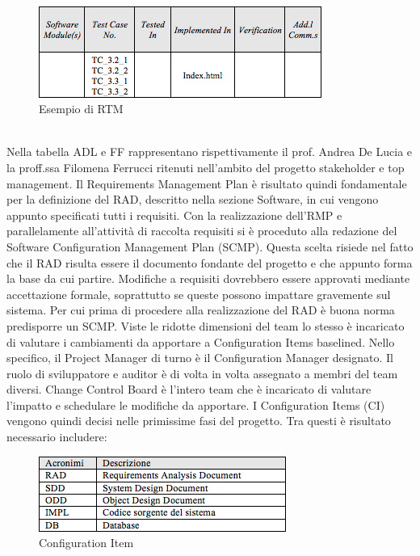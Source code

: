 \\
\begin{figure}[h]
\centering
\includegraphics[scale=.7]{img/4.png}
\caption{Esempio di RTM}
\label{fig:cd}
\end{figure}
\\
Nella tabella ADL e FF rappresentano rispettivamente il prof. Andrea De Lucia e la proff.ssa Filomena Ferrucci ritenuti nell\rq ambito del progetto stakeholder e top management.
Il Requirements Management Plan \`{e} risultato quindi fondamentale per la definizione del RAD, descritto nella sezione Software, in cui vengono appunto specificati tutti i requisiti.
Con la realizzazione dell\rq RMP e parallelamente all’attivit\`{a} di raccolta requisiti si \`{e} proceduto alla redazione del Software Configuration Management Plan (SCMP). Questa scelta risiede nel fatto che il RAD risulta essere il documento fondante del progetto e che appunto forma la base da cui partire. Modifiche a requisiti dovrebbero essere approvati mediante accettazione formale, soprattutto se queste possono impattare gravemente sul sistema.
Per cui prima di procedere alla realizzazione del RAD \`{e} buona norma predisporre un SCMP. 
Viste le ridotte dimensioni del team lo stesso \`{e} incaricato di valutare i cambiamenti da apportare a Configuration Items baselined.
Nello specifico, il Project Manager di turno \`{e} il Configuration Manager designato. Il ruolo di sviluppatore e auditor \`{e} di volta in volta assegnato a membri del team diversi.
Change Control Board \`{e} l\rq intero team che \`{e} incaricato di valutare l\rq impatto e schedulare le modifiche da apportare.
I Configuration Items (CI) vengono quindi decisi nelle primissime fasi del progetto. Tra questi \`{e} risultato necessario includere: 
\begin{figure}[h]
\centering
\includegraphics[scale=.7]{img/5.png}
\caption{Configuration Item}
\label{fig:cd}
\end{figure}
